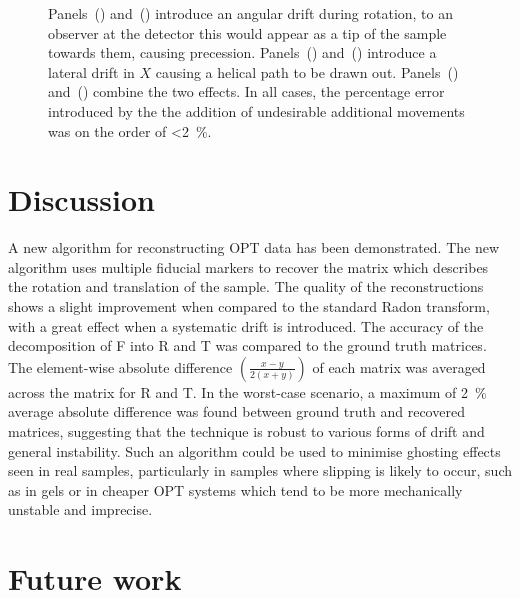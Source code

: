\documentclass[times, twoside, watermark]{zHenriquesLab-StyleBioRxiv}
\begin{document}
\begin{figure}
{          Panels~() and~() introduce an angular drift during rotation, to an observer at the detector this would appear as a tip of the sample towards them, causing precession.
          Panels~() and~() introduce a lateral drift in \(X\) causing a helical path to be drawn out.
          Panels~() and~() combine the two effects.
          In all cases, the percentage error introduced by the the addition of undesirable additional movements was on the order of \SI{<2}{\percent}.
          }\label{fig:pc_sum_decompose}
\end{figure}

\section{Discussion}

A new algorithm for reconstructing OPT data has been demonstrated.
The new algorithm uses multiple fiducial markers to recover the matrix which describes the rotation and translation of the sample.
The quality of the reconstructions shows a slight improvement when compared to the standard \gls{Radon transform}, with a great effect when a systematic drift is introduced.
The accuracy of the decomposition of \gls{F} into \gls{R} and \gls{T} was compared to the ground truth matrices.
The element-wise absolute difference \(\left(\frac{x-y}{2(x+y)}\right)\) of each matrix was averaged across the matrix for \gls{R} and \gls{T}.
In the worst-case scenario, a maximum of \SI{2}{\percent} average absolute difference was found between ground truth and recovered matrices,
suggesting that the technique is robust to various forms of drift and general instability.
Such an algorithm could be used to minimise ghosting effects seen in real samples, particularly in samples where slipping is likely to occur, such as in gels or in cheaper \gls{OPT} systems which tend to be more mechanically unstable and imprecise.

\section{Future work}
\end{document}
